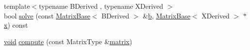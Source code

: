 \begin{DoxyCompactItemize}
\item 
{\footnotesize template$<$typename B\-Derived , typename X\-Derived $>$ }\\bool \hyperlink{class_sparse_l_u_3_01_matrix_type_00_01_super_l_u_01_4_a2a72fefce4fbeb75b4dfaef6d9e826b8}{solve} (const \hyperlink{class_matrix_base}{Matrix\-Base}$<$ B\-Derived $>$ \&\hyperlink{glext_8h_a6eba317e3cf44d6d26c04a5a8f197dcb}{b}, \hyperlink{class_matrix_base}{Matrix\-Base}$<$ X\-Derived $>$ $\ast$\hyperlink{glext_8h_a1db9d104e3c2128177f26aff7b46982f}{x}) const 
\item 
\hyperlink{group___u_a_v_objects_plugin_ga444cf2ff3f0ecbe028adce838d373f5c}{void} \hyperlink{class_sparse_l_u_3_01_matrix_type_00_01_super_l_u_01_4_a30d338f40ce6303cb8300e492ac847ca}{compute} (const Matrix\-Type \&\hyperlink{glext_8h_a7b24a3f2f56eb1244ae69dacb4fecb6f}{matrix})
\end{DoxyCompactItemize}
